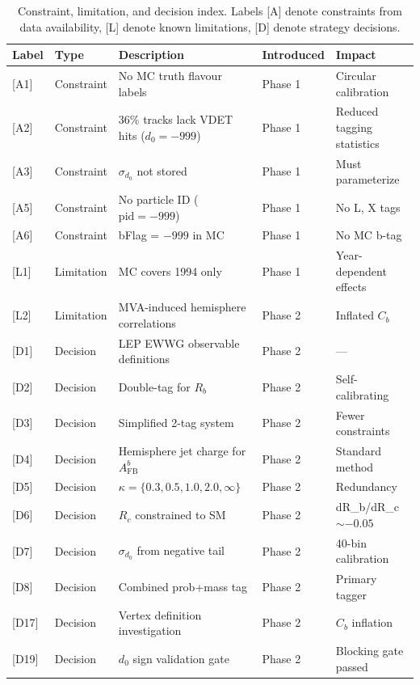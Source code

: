 \documentclass[11pt,a4paper]{article}
\begin{document}
\begin{table}[htbp]
\centering
\caption{Constraint, limitation, and decision index. Labels [A] denote constraints
from data availability, [L] denote known limitations, [D] denote strategy decisions.}
\label{tab:limitation_index}
\small
\begin{tabular}{llp{6cm}ll}
\toprule
Label & Type & Description & Introduced & Impact \\
\midrule
{[A1]} & Constraint & No MC truth flavour labels & Phase 1 & Circular calibration \\
{[A2]} & Constraint & 36\% tracks lack VDET hits ($d_0 = -999$) & Phase 1 & Reduced tagging statistics \\
{[A3]} & Constraint & $\sigma_{d_0}$ not stored & Phase 1 & Must parameterize \\
{[A5]} & Constraint & No particle ID ($\mathrm{pid} = -999$) & Phase 1 & No L, X tags \\
{[A6]} & Constraint & bFlag = $-999$ in MC & Phase 1 & No MC b-tag \\
{[L1]} & Limitation & MC covers 1994 only & Phase 1 & Year-dependent effects \\
{[L2]} & Limitation & MVA-induced hemisphere correlations & Phase 2 & Inflated $C_b$ \\
{[D1]} & Decision & LEP EWWG observable definitions & Phase 2 & --- \\
{[D2]} & Decision & Double-tag for $R_b$ & Phase 2 & Self-calibrating \\
{[D3]} & Decision & Simplified 2-tag system & Phase 2 & Fewer constraints \\
{[D4]} & Decision & Hemisphere jet charge for $A_\mathrm{FB}^b$ & Phase 2 & Standard method \\
{[D5]} & Decision & $\kappa = \{0.3, 0.5, 1.0, 2.0, \infty\}$ & Phase 2 & Redundancy \\
{[D6]} & Decision & $R_c$ constrained to SM & Phase 2 & dR\_b/dR\_c $\sim -0.05$ \\
{[D7]} & Decision & $\sigma_{d_0}$ from negative tail & Phase 2 & 40-bin calibration \\
{[D8]} & Decision & Combined prob+mass tag & Phase 2 & Primary tagger \\
{[D17]} & Decision & Vertex definition investigation & Phase 2 & $C_b$ inflation \\
{[D19]} & Decision & $d_0$ sign validation gate & Phase 2 & Blocking gate passed \\
\bottomrule
\end{tabular}
\end{table}
\end{document}
